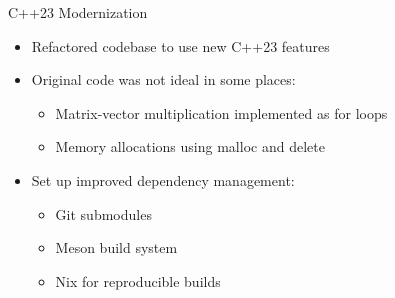 \documentclass[aspectratio=169]{beamer}
\begin{document}
\begin{frame}{C++23 Modernization}
    \begin{itemize}[<+->]
        \item Refactored codebase to use new C++23 features
        \item Original code was not ideal in some places:
              \begin{itemize}
                  \item Matrix-vector multiplication implemented as for loops
                  \item Memory allocations using malloc and delete
              \end{itemize}
        \item Set up improved dependency management:
              \begin{itemize}
                  \item Git submodules
                  \item Meson build system
                  \item Nix for reproducible builds
              \end{itemize}
    \end{itemize}

\end{frame}
\end{document}
